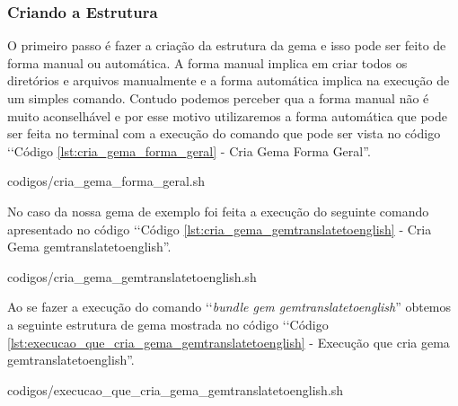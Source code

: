 \subsubsection{Criando a Estrutura}
\label{subsubsection:criando_a_estrutura}

O primeiro passo é fazer a criação da estrutura da gema e isso pode ser feito de forma manual ou automática. 
A forma manual implica em criar todos os diretórios e arquivos manualmente e a forma automática implica na
execução de um simples comando. Contudo podemos perceber qua a forma manual não é muito aconselhável e 
por esse motivo utilizaremos a forma automática que pode ser feita no terminal com a execução do comando
que pode ser vista no código ‘‘Código \ref{lst:cria_gema_forma_geral} - Cria Gema Forma Geral''.


{codigos/cria_gema_forma_geral.sh}

No caso da nossa gema de exemplo foi feita a execução do seguinte comando apresentado no código 
‘‘Código \ref{lst:cria_gema_gemtranslatetoenglish} - Cria Gema gemtranslatetoenglish''.


{codigos/cria_gema_gemtranslatetoenglish.sh}

Ao se fazer a execução do comando ‘‘\emph{bundle gem gemtranslatetoenglish}'' obtemos a seguinte estrutura de gema mostrada 
no código ‘‘Código \ref{lst:execucao_que_cria_gema_gemtranslatetoenglish} - Execução que cria gema gemtranslatetoenglish''.


{codigos/execucao_que_cria_gema_gemtranslatetoenglish.sh}

